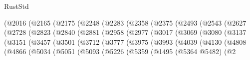 \begin{lexlean}{RustStd}
\begin{coremodule}
                    (@2016
                      (@2165
                        (@2175
                          (@2248
                            (@2283
                              (@2358
                                (@2375
                                  (@2493
                                    (@2543
                                      (@2627
                                        (@2728
                                          (@2823
                                            (@2840
                                              (@2881
                                                (@2958
                                                  (@2977
                                                    (@3017
                                                      (@3069
                                                        (@3080
                                                          (@3137
                                                            (@3151
                                                              (@3457
                                                                (@3501
                                                                  (@3712
                                                                    (@3777
                                                                      (@3975
                                                                        (@3993
                                                                          (@4039
                                                                            (@4130
                                                                              (@4808
                                                                                (@4866
                                                                                  (@5034
                                                                                    (@5051
                                                                                      (@5093
                                                                                        (@5226
                                                                                          (@5359
                                                                                            (@1495
                                                                                              (@5364
                                                                                                @5482)
                                                                                              (@2

\end{coremodule}
\end{lexlean}
